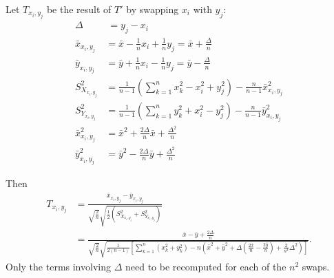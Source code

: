 Let $T_{x_i,y_j}$ be the result of $T'$ by swapping $x_i$ with $y_j$:
\begin{align*}
  \Delta &\:= y_j-x_i \\
  \bar{x}_{x_i,y_j} &= \bar{x}-\frac{1}{n}x_i+\frac{1}{n}y_j =
  \bar{x}+\frac{\Delta}{n} \\
  \bar{y}_{x_i,y_j} &= \bar{y}+\frac{1}{n}x_i-\frac{1}{n}y_j =
  \bar{y}-\frac{\Delta}{n} \\
  S_{X_{x_i,y_j}}^2 &= \frac{1}{n-1}(\sum_{k=1}^n x_k^2 - x_i^2 +
  y_j^2) - \frac{n}{n-1}\bar{x}^2_{x_i,y_j} \\
  S_{Y_{x_i,y_j}}^2 &= \frac{1}{n-1}(\sum_{k=1}^n y_k^2 + x_i^2 -
  y_j^2) - \frac{n}{n-1}\bar{y}^2_{x_i,y_j} \\
  \bar{x}_{x_i,y_j}^2 &= \bar{x}^2 + \frac{2\Delta}{n}\bar{x} +
  \frac{\Delta^2}{n} \\
  \bar{y}_{x_i,y_j}^2 &= \bar{y}^2 - \frac{2\Delta}{n}\bar{y} + \frac{\Delta^2}{n}
\end{align*}

Then
\begin{align*}
  T_{x_i,y_j} &= \frac{\bar{x}_{x_i,y_j}-\bar{y}_{x_i,y_j}}
  {\sqrt{\frac{2}{n}}\sqrt{\frac{1}{2}(S_{X_{x_i,y_j}}^2+S_{Y_{x_i,y_j}}^2)}}\\
  &= \frac{\bar{x}-\bar{y}+\frac{2\Delta}{n}}
  {\sqrt{\frac{2}{n}}\sqrt{\frac{1}{2(n-1)}[\sum_{k=1}^n (x_k^2+y_k^2)
      -n(\bar{x}^2+\bar{y}^2+\Delta(\frac{2\bar{x}}{n}
      -\frac{2\bar{y}}{n})+\frac{2}{n^2}\Delta^2)]}}.
\end{align*}
Only the terms involving $\Delta$ need to be recomputed for each of the $n^2$ swaps.

